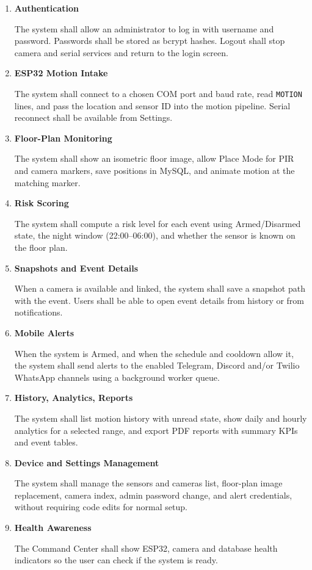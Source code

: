 \documentclass[12pt,a4paper]{report}
\begin{document}
\begin{enumerate}
\newpage

\item \textbf{Authentication}

The system shall allow an administrator to log in with username and password. Passwords shall be stored as bcrypt hashes. Logout shall stop camera and serial services and return to the login screen.

\item \textbf{ESP32 Motion Intake}

The system shall connect to a chosen COM port and baud rate, read \texttt{MOTION} lines, and pass the location and sensor ID into the motion pipeline. Serial reconnect shall be available from Settings.

\item \textbf{Floor-Plan Monitoring}

The system shall show an isometric floor image, allow Place Mode for PIR and camera markers, save positions in MySQL, and animate motion at the matching marker.

\item \textbf{Risk Scoring}

The system shall compute a risk level for each event using Armed/Disarmed state, the night window (22:00--06:00), and whether the sensor is known on the floor plan.

\item \textbf{Snapshots and Event Details}

When a camera is available and linked, the system shall save a snapshot path with the event. Users shall be able to open event details from history or from notifications.

\item \textbf{Mobile Alerts}

When the system is Armed, and when the schedule and cooldown allow it, the system shall send alerts to the enabled Telegram, Discord and/or Twilio WhatsApp channels using a background worker queue.

\item \textbf{History, Analytics, Reports}

The system shall list motion history with unread state, show daily and hourly analytics for a selected range, and export PDF reports with summary KPIs and event tables.

\item \textbf{Device and Settings Management}

The system shall manage the sensors and cameras list, floor-plan image replacement, camera index, admin password change, and alert credentials, without requiring code edits for normal setup.

\item \textbf{Health Awareness}

The Command Center shall show ESP32, camera and database health indicators so the user can check if the system is ready.

\end{enumerate}
\end{document}

